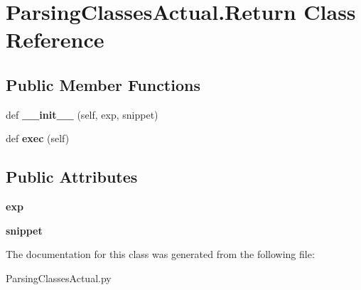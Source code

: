 \hypertarget{class_parsing_classes_actual_1_1_return}{}\section{Parsing\+Classes\+Actual.\+Return Class Reference}
\label{class_parsing_classes_actual_1_1_return}
\subsection*{Public Member Functions}
\begin{DoxyCompactItemize}
\item 
def {\bfseries \+\_\+\+\_\+init\+\_\+\+\_\+} (self, exp, snippet)\hypertarget{class_parsing_classes_actual_1_1_return_af8d6700c68272fc7a9f66befd743e547}{}\label{class_parsing_classes_actual_1_1_return_af8d6700c68272fc7a9f66befd743e547}

\item 
def {\bfseries exec} (self)\hypertarget{class_parsing_classes_actual_1_1_return_a0abe605098c54c3c29e865a40efb58ce}{}\label{class_parsing_classes_actual_1_1_return_a0abe605098c54c3c29e865a40efb58ce}

\end{DoxyCompactItemize}
\subsection*{Public Attributes}
\begin{DoxyCompactItemize}
\item 
{\bfseries exp}\hypertarget{class_parsing_classes_actual_1_1_return_a49d43bb82d1a79d3f181dbc8cf159f09}{}\label{class_parsing_classes_actual_1_1_return_a49d43bb82d1a79d3f181dbc8cf159f09}

\item 
{\bfseries snippet}\hypertarget{class_parsing_classes_actual_1_1_return_af4603fca7bfda265c24ce85e21f1c21a}{}\label{class_parsing_classes_actual_1_1_return_af4603fca7bfda265c24ce85e21f1c21a}

\end{DoxyCompactItemize}


The documentation for this class was generated from the following file\+:\begin{DoxyCompactItemize}
\item 
Parsing\+Classes\+Actual.\+py\end{DoxyCompactItemize}
